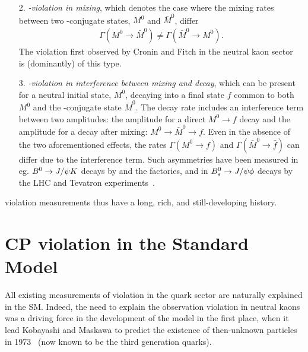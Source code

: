 \begin{enumerate}
    \item[2.] \emph{\CP-violation in mixing}, which denotes the case where the mixing rates between two \CP-conjugate states, $M^0$ and $\bar M^0$, differ
    \begin{align}
        \Gamma (M^0 \to \bar M^0) \neq \Gamma (\bar  M^0 \to M^0).
    \end{align}
    The \CP violation first observed by Cronin and Fitch in the neutral kaon sector~\cite{KroninFitch1964} is (dominantly) of this type. 
    
    \item[3.] \emph{\CP-violation in interference between mixing and decay}, which can be present for a neutral initial state, $M^0$, decaying into a final state $f$ common to both $M^0$ and the \CP-conjugate state $\bar M^0$. The decay rate includes an interference term between two amplitudes: the amplitude for a direct $M^0\to f$ decay and the amplitude for a decay after mixing: $M^0\to\bar M^0\to f$. Even in the absence of the two aforementioned effects, the rates $\Gamma(M^0\to f)$ and $\Gamma(\bar M^0\to \bar f)$ can differ due to the interference term. Such \CP asymmetries have been measured in eg. ${{B}^0}\rightarrow J/\psi K$ decays by \lhcb and the \B factories, and in ${{B}^0_{s}}\rightarrow J/\psi \phi$ decays by the LHC and Tevatron experiments~\cite{HFLAV}.
\end{enumerate}
\CP violation measurements thus have a long, rich, and still-developing history.  


\section{CP violation in the Standard Model} %
\label{sec:cp_violation_in_the_standard_model}

All existing measurements of \CP violation in the quark sector are naturally explained in the SM. Indeed, the need to explain the observation \CP violation in neutral kaons was a driving force in the development of the model in the first place, when it lead Kobayashi and Maskawa to predict the existence of then-unknown particles in 1973~\cite{kobayashiCPViolationRenormalizableTheory1973} (now known to be the third generation quarks). 

